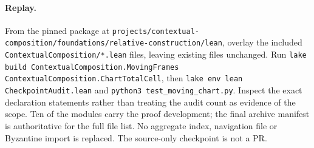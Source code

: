 \paragraph{Replay.} From the pinned package at
\texttt{projects/contextual-composition/foundations/relative-construction/lean},
overlay the included \texttt{ContextualComposition/*.lean} files, leaving
existing files unchanged. Run
\texttt{lake build ContextualComposition.MovingFrames ContextualComposition.ChartTotalCell},
then \texttt{lake env lean CheckpointAudit.lean} and
\texttt{python3 test\_moving\_chart.py}. Inspect the exact declaration
statements rather than treating the audit count as evidence of the scope.
Ten of the modules carry the proof development; the final archive manifest
is authoritative for the full file list. No aggregate index, navigation file
or Byzantine import is replaced. The source-only checkpoint is not a PR.
